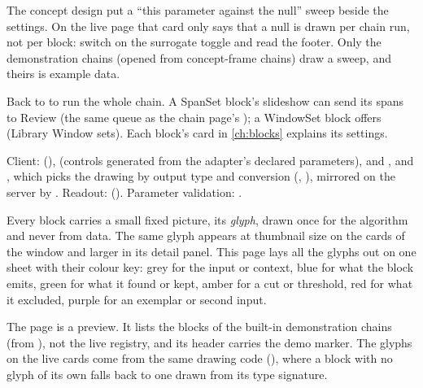 
\begin{watchout}
The concept design put a ``this parameter against the null'' sweep beside the settings. On the live
page that card only says that a null is drawn per chain run, not per block: switch on the
surrogate toggle and read the footer. Only the demonstration chains (opened from 
\textrightarrow{} concept-frame chains) draw a sweep, and theirs is example data.
\end{watchout}

Back to  to run the whole chain. A SpanSet block's slideshow can send its
spans to Review (the same queue as the chain page's ); a WindowSet block
offers  (Library \textrightarrow{} Window sets). Each block's card in
\cref{ch:blocks} explains its settings.

\begin{underthehood}
Client:  (), 
(controls generated from the adapter's declared parameters),  and
, and , which picks the drawing by output type and
conversion (, ), mirrored on the server by
. Readout: 
(). Parameter validation: .
\end{underthehood}

Every block carries a small fixed picture, its \emph{glyph}, drawn once for the algorithm and
never from data. The same glyph appears at thumbnail size on the cards of the 
window and larger in its detail panel. This page lays all the glyphs out on one sheet with their
colour key: grey for the input or context, blue for what the block emits, green for what it found
or kept, amber for a cut or threshold, red for what it excluded, purple for an exemplar or second
input.

The page is a preview. It lists the blocks of the built-in demonstration chains (from
), not the live registry, and its header carries the
demo marker. The glyphs on the live  cards come from the same drawing code
(), where a block with no glyph of its own falls back to
one drawn from its type signature.


